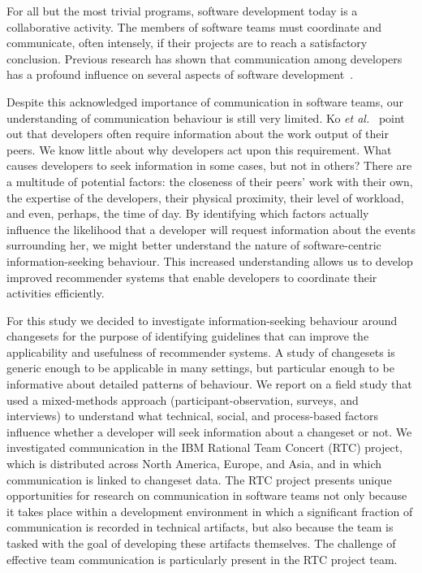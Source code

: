 \documentclass[12pt,oneside]{book}
\begin{document}

For all but the most trivial programs, software development today is a collaborative activity. The members of software teams must coordinate and communicate, often intensely, if their projects are to reach a satisfactory conclusion.
Previous research has shown that communication among developers has a profound influence on several aspects of software development~\cite{hinds:cscw:2006,wolf:icse:2009}.

Despite this acknowledged importance of communication in software teams, our understanding of communication behaviour is still very limited. Ko \emph{et al.}~\cite{ko:icse:2007} point out that developers often require information about the work output of their peers.  We know little about why developers act upon this requirement. What causes developers to seek information in some cases, but not in others? There are a multitude of potential factors: the closeness of their peers' work with their own, the expertise of the developers, their physical proximity, their level of workload, and even, perhaps, the time of day. By identifying which factors actually influence the likelihood that a developer will request information about the events surrounding her, we might better understand the nature of software-centric information-seeking behaviour. This increased understanding allows us to develop improved recommender systems that enable developers to coordinate their activities efficiently.

For this study we decided to investigate information-seeking behaviour around changesets for the purpose of identifying guidelines that can improve the applicability and usefulness of recommender systems. A study of changesets is generic enough to be applicable in many settings, but particular enough to be informative about detailed patterns of behaviour. We report on a field study that used a mixed-methods approach (participant-observation, surveys, and interviews) to understand what technical, social, and process-based factors influence whether a developer will seek information about a changeset or not. We investigated communication in the IBM Rational Team Concert (RTC) project, which is distributed across North America, Europe, and Asia, and in which communication is linked to changeset data. The RTC project presents unique opportunities for research on communication in software teams not only because it takes place within a development environment in which a significant fraction of communication is recorded in technical artifacts, but also because the team is tasked with the goal of developing these artifacts themselves. The challenge of effective team communication is particularly present in the RTC project team. 
\end{document}
